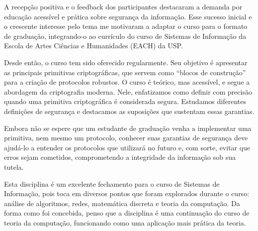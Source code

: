 A recepção positiva e o feedback dos participantes destacaram a demanda por educação acessível e prática sobre segurança da informação.
Esse sucesso inicial e o crescente interesse pelo tema me motivaram a adaptar o curso para o formato de graduação, integrando-o ao currículo do curso de Sistemas de Informação da Escola de Artes Ciências e Humanidades (EACH) da USP.

Desde então, o curso tem sido oferecido regularmente.
Seu objetivo é apresentar as principais primitivas criptográficas, que servem como ``blocos de construção'' para a criação de protocolos robustos.
O curso é teórico, mas acessível, e segue a abordagem da criptografia moderna.
Nele, enfatizamos como definir com precisão quando uma primitiva criptográfica é considerada segura.
Estudamos diferentes definições de segurança e destacamos as suposições que sustentam essas garantias.

Embora não se espere que um estudante de graduação venha a implementar uma primitiva, nem mesmo um protocolo, conhecer suas garantias de segurança deve ajudá-lo a entender os protocolos que utilizará no futuro e, com sorte, evitar que erros sejam cometidos, comprometendo a integridade da informação sob sua tutela.

Esta disciplina é um excelente fechamento para o curso de Sistemas de Informação, pois toca em diversos pontos que foram explorados durante o curso: análise de algoritmos, redes, matemática discreta e teoria da computação.
Da forma como foi concebida, penso que a disciplina é uma continuação do curso de teoria da computação, funcionando como uma aplicação mais prática da teoria.

